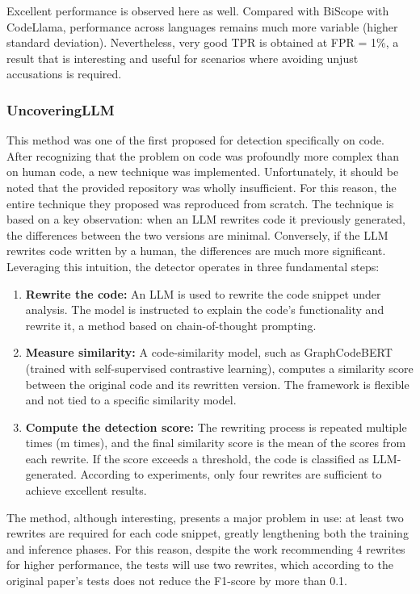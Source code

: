Excellent performance is observed here as well. Compared with BiScope 
with CodeLlama, performance across languages remains much more variable 
(higher standard deviation). Nevertheless, very good TPR is obtained at FPR = 1\%, 
a result that is interesting and useful for scenarios where avoiding unjust 
accusations is required.


\clearpage
\subsubsection{UncoveringLLM}
This method was one of the first proposed for detection specifically on code. 
After recognizing that the problem on code was profoundly more complex than on 
human code, a new technique was implemented. Unfortunately, it should be noted 
that the provided repository was wholly insufficient. For this reason, the entire 
technique they proposed was reproduced from scratch.
The technique is based on a key observation: when an LLM rewrites code it previously 
generated, the differences between the two versions are minimal. Conversely, if the 
LLM rewrites code written by a human, the differences are much more significant. 
Leveraging this intuition, the detector operates in three fundamental steps:

\begin{enumerate}
\item \textbf{Rewrite the code:} An LLM is used to rewrite the code snippet under analysis. 
The model is instructed to explain the code’s functionality and rewrite it, a 
method based on chain-of-thought prompting.

\item \textbf{Measure similarity:} A code-similarity model, such as 
GraphCodeBERT\cite{guo2020graphcodebert} 
(trained with self-supervised contrastive learning), computes a similarity 
score between the original code and its rewritten version. The framework is 
flexible and not tied to a specific similarity model.

\item \textbf{Compute the detection score:} The rewriting process is repeated multiple times 
(m times), and the final similarity score is the mean of the scores from each 
rewrite. If the score exceeds a threshold, the code is classified as LLM-generated. 
According to experiments, only four rewrites are sufficient to achieve excellent results.
\end{enumerate}

The method, although interesting, presents a major problem in use: 
at least two rewrites are required for each code snippet, greatly 
lengthening both the training and inference phases. For this reason, 
despite the work recommending 4 rewrites for higher performance, the tests 
will use two rewrites, which according to the original paper’s tests does not 
reduce the F1-score by more than 0.1.

